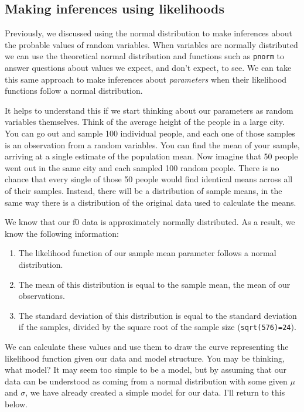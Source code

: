 \documentclass[
]{book}
\begin{document}
\hypertarget{making-inferences-using-likelihoods}{%
\subsection{Making inferences using likelihoods}\label{making-inferences-using-likelihoods}}

Previously, we discussed using the normal distribution to make inferences about the probable values of random variables. When variables are normally distributed we can use the theoretical normal distribution and functions such as \texttt{pnorm} to answer questions about values we expect, and don't expect, to see. We can take this same approach to make inferences about \emph{parameters} when their likelihood functions follow a normal distribution.

It helps to understand this if we start thinking about our parameters as random variables themselves. Think of the average height of the people in a large city. You can go out and sample 100 individual people, and each one of those samples is an observation from a random variables. You can find the mean of your sample, arriving at a single estimate of the population mean. Now imagine that 50 people went out in the same city and each sampled 100 random people. There is no chance that every single of those 50 people would find identical means across all of their samples. Instead, there will be a distribution of sample means, in the same way there is a distribution of the original data used to calculate the means.

We know that our f0 data is approximately normally distributed. As a result, we know the following information:

\begin{enumerate}
\def\labelenumi{\arabic{enumi})}
\item
  The likelihood function of our sample mean parameter follows a normal distribution.
\item
  The mean of this distribution is equal to the sample mean, the mean of our observations.
\item
  The standard deviation of this distribution is equal to the standard deviation if the samples, divided by the square root of the sample size (\texttt{sqrt(576)=24}).
\end{enumerate}

We can calculate these values and use them to draw the curve representing the likelihood function given our data and model structure. You may be thinking, what model? It may seem too simple to be a model, but by assuming that our data can be understood as coming from a normal distribution with some given \(\mu\) and \(\sigma\), we have already created a simple model for our data. I'll return to this below.
\end{document}
